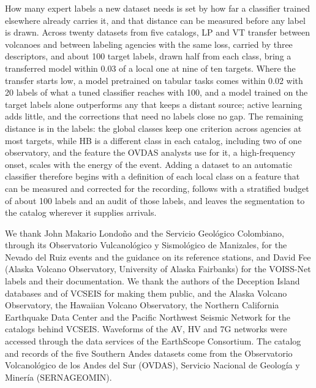 \documentclass[pdflatex,sn-mathphys-num]{sn-jnl}
\begin{document}
How many expert labels a new dataset needs is set by how far a classifier
trained elsewhere already carries it, and that distance can be measured
before any label is drawn. Across twenty datasets from five catalogs, LP
and VT transfer between volcanoes and between labeling agencies with the
same loss, carried by three descriptors, and about 100 target labels, drawn
half from each class, bring a transferred model within 0.03 of a local one
at nine of ten targets. Where the transfer starts low, a model pretrained on
tabular tasks comes within 0.02 with 20 labels of what a tuned classifier
reaches with 100, and a model trained on the target labels alone outperforms any
that keeps a distant source; active learning adds little, and the
corrections that need no labels close no gap. The remaining distance is in
the labels: the global classes keep one criterion across agencies at most
targets, while HB is a different class in each catalog, including two of one
observatory, and the feature the OVDAS analysts use for it, a high-frequency
onset, scales with the energy of the event. Adding a dataset to an
automatic classifier therefore begins with a definition of each local class
on a feature that can be measured and corrected for the recording, follows with a stratified budget of about 100 labels and an audit of
those labels, and leaves the segmentation to the catalog wherever it
supplies arrivals.


\backmatter



We thank John Makario Londo\~no and the Servicio Geol\'ogico Colombiano,
through its Observatorio Vulcanol\'ogico y Sismol\'ogico de Manizales, for
the Nevado del Ruiz events and the guidance on its reference stations, and
David Fee (Alaska Volcano Observatory, University of Alaska Fairbanks) for the
VOISS-Net labels and their documentation. We thank the authors of the
Deception Island databases \cite{cortes_moreno_vsr_2018} and of VCSEIS
\cite{zhong_deep-learning-based_2024} for making them public, and the Alaska
Volcano Observatory, the Hawaiian Volcano Observatory, the Northern California
Earthquake Data Center and the Pacific Northwest Seismic Network for the
catalogs behind VCSEIS. Waveforms of the AV, HV and 7G networks were accessed
through the data services of the EarthScope Consortium. The catalog and
records of the five Southern Andes datasets come from the Observatorio
Volcanol\'ogico de los Andes del Sur (OVDAS), Servicio Nacional de Geolog\'ia
y Miner\'ia (SERNAGEOMIN).
\end{document}
